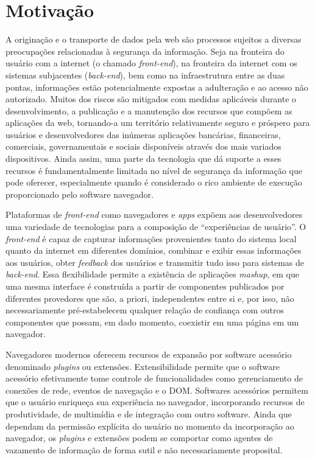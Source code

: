 \section{Motivação}
A originação e o transporte de dados pela web são processos sujeitos a diversas preocupações relacionadas à segurança da informação. Seja na fronteira do usuário com a internet (o chamado \textit{front-end}), na fronteira da internet com os sistemas subjacentes (\textit{back-end}), bem como na infraestrutura entre as duas pontas, informações estão potencialmente expostas a adulteração e ao acesso não autorizado. Muitos dos riscos são mitigados com medidas aplicáveis durante o desenvolvimento, a publicação e a manutenção dos recursos que compõem as aplicações da web, tornando-a um território relativamente seguro e próspero para usuários e desenvolvedores das inúmeras aplicações bancárias, financeiras, comerciais, governamentais e sociais disponíveis através dos mais variados dispositivos. Ainda assim, uma parte da tecnologia que dá suporte a esses recursos é fundamentalmente limitada no nível de segurança da informação que pode oferecer, especialmente quando é considerado o rico ambiente de execução proporcionado pelo software navegador.

Plataformas de \textit{front-end} como navegadores e \textit{apps} expõem aos desenvolvedores uma variedade de tecnologias para a composição de ``experiências de usuário''. O \textit{front-end} é capaz de capturar informações  provenientes tanto do sistema local quanto da internet em diferentes domínios, combinar e exibir essas informações aos usuários, obter \textit{feedback} dos usuários e transmitir tudo isso para sistemas de \textit{back-end}. Essa flexibilidade permite a existência de aplicações \textit{mashup}, em que uma mesma interface é construída a partir de componentes publicados por diferentes provedores que são, a priori, independentes entre si e, por isso, não necessariamente pré-estabelecem qualquer relação de confiança com outros componentes que possam, em dado momento, coexistir em uma página em um navegador.

Navegadores modernos oferecem recursos de expansão por software acessório denominado \textit{plugins} ou extensões. Extensibilidade permite que o software acessório efetivamente tome controle de funcionalidades como gerenciamento de conexões de rede, eventos de navegação e o DOM. Softwares acessórios permitem que o usuário enriqueça sua experiência no navegador, incorporando recursos de produtividade, de multimídia e de integração com outro software. Ainda que dependam da permissão explícita do usuário no momento da incorporação ao navegador, os \textit{plugins} e extensões podem se comportar como agentes de vazamento de informação de forma sutil e não necessariamente proposital.

